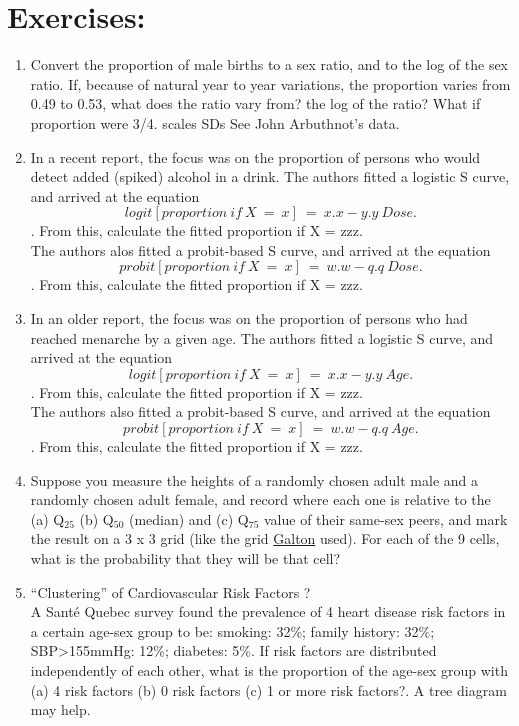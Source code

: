 \documentclass[]{book}
\begin{document}
\hypertarget{exercises-1}{%
\section{Exercises:}\label{exercises-1}}

\begin{enumerate}
\def\labelenumi{\arabic{enumi}.}
\item
  Convert the proportion of male births to a sex ratio, and to the log of the sex ratio. If, because of natural year to year variations, the proportion varies from 0.49 to 0.53, what does the ratio vary from? the log of the ratio? What if proportion were 3/4. scales SDs See John Arbuthnot's data.
\item
  In a recent report, the focus was on the proportion of persons who would detect added (spiked) alcohol in a drink. The authors fitted a logistic S curve, and arrived at the equation \[ logit[proportion \ if  \ X \  = \ x] \ = \ x.x - y.y \ Dose.\]. From this, calculate the fitted proportion if X = zzz.\\
  The authors alos fitted a probit-based S curve, and arrived at the equation \[ probit[proportion \ if  \ X \  = \ x] \ = \ w.w - q.q \ Dose.\]. From this, calculate the fitted proportion if X = zzz.
\item
  In an older report, the focus was on the proportion of persons who had reached menarche by a given age. The authors fitted a logistic S curve, and arrived at the equation \[ logit[proportion \ if  \ X \  = \ x] \ = \ x.x - y.y \ Age.\]. From this, calculate the fitted proportion if X = zzz.\\
  The authors also fitted a probit-based S curve, and arrived at the equation \[ probit[proportion \ if  \ X \  = \ x] \ = \ w.w - q.q \ Age.\]. From this, calculate the fitted proportion if X = zzz.
\item
  Suppose you measure the heights of a randomly chosen adult male and a randomly chosen adult female, and record where each one is relative to the (a) Q\(_{25}\) (b) Q\(_{50}\) (median) and (c) Q\(_{75}\) value of their same-sex peers, and mark the result on a 3 x 3 grid (like the grid \href{http://www.biostat.mcgill.ca/hanley/statbook/GaltonHeightCouples.png}{Galton} used). For each of the 9 cells, what is the probability that they will be that cell?
\item
  ``Clustering'' of Cardiovascular Risk Factors ?\\
  A Santé Quebec survey found the prevalence of 4 heart disease risk factors in a certain age-sex group to be: smoking: 32\%; family history: 32\%; SBP\textgreater{}155mmHg: 12\%; diabetes: 5\%. If risk factors are distributed independently of each other, what is the proportion of the age-sex group with (a) 4 risk factors (b) 0 risk factors (c) 1 or more risk factors?. A tree diagram may help.

\end{enumerate}
\end{document}
